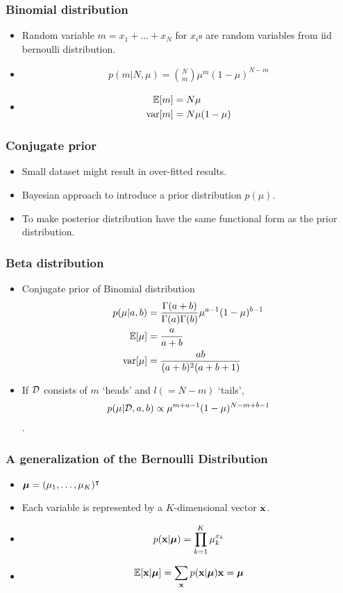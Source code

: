 \documentclass[10pt,mathserif]{beamer}
\begin{document}
\begin{frame}
\frametitle{Binomial distribution}
\begin{itemize}
\item Random variable $m=x_1+\ldots+x_N$ for $x_i$s are random variables from iid bernoulli distribution.
\item
\begin{align}
p(m| N,\mu)= {N \choose m} \mu^m (1-\mu)^{N-m}\nonumber
\end{align}
\item
\begin{align}
    \mathbb{E}[m]&= N\mu\nonumber\\
    \mathrm{var}[m]&= N\mu(1-\mu)\nonumber
\end{align}
\end{itemize}
\end{frame}
\begin{frame}
\frametitle{Conjugate prior }
\begin{itemize}
\item Small dataset might result in over-fitted results.
\item Bayesian approach to introduce a prior distribution $p(\mu)$.
\item To make posterior distribution have the same functional form as the prior distribution.
\end{itemize}
\end{frame}
\begin{frame}
\frametitle{Beta distribution}
\begin{itemize}
\item Conjugate prior of Binomial distribution
\begin{align}
p(\mu| a,b) &= \frac{\Gamma(a+b)}{\Gamma(a)\Gamma(b)} \mu^{a-1}(1-\mu)^{b-1}\nonumber\\
\mathbb{E}[\mu] &= \frac{a}{a+b} \nonumber\\
\mathrm{var}[\mu] &= \frac{ab}{(a+b)^2(a+b+1)} \nonumber
\end{align}
\item If $\mathcal{D}$ consists of $m$ `heads' and $l(=N-m)$ `tails', 
\begin{align}
p(\mu | \mathcal{D},a,b) \propto \mu^{m+a-1}(1-\mu)^{N-m+b-1} \nonumber
\end{align}.
\end{itemize}
\end{frame}
\begin{frame}
\frametitle{A generalization of the Bernoulli Distribution}
\begin{itemize}
\item $\boldsymbol{\mu} = (\mu_1,\ldots, \mu_K)^\intercal$
\item Each variable is represented by a $K$-dimensional vector $\mathbf{x}$.
\item 
\begin{align}
p(\mathbf{x} | \boldsymbol{\mu}) = \prod_{k=1}^K \mu_k^{x_k}\nonumber
\end{align}
\item
\begin{align}
\mathbb{E}[\mathbf{x} | \boldsymbol{\mu}] = \sum_{\mathbf{x}} p(\mathbf{x} | \boldsymbol{\mu}) \mathbf{x} = \boldsymbol{\mu}\nonumber
\end{align}
\end{itemize}
\end{frame}
\end{document}
